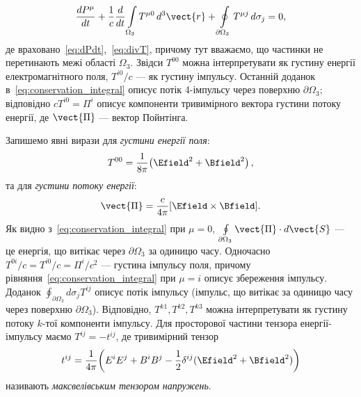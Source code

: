\begin{equation}\label{eq:conservation_integral}
    \frac{dP^{\mu}}{dt}
    + \frac{1}{c}\frac{d}{dt}\int\limits_{\Omega_3}T^{\mu 0}\,d^3\vect{r}
    + \oint\limits_{\partial\Omega_3}T^{\mu j}\,d\sigma_j = 0,
\end{equation}
де враховано~\eqref{eq:dPdt},~\eqref{eq:divT}, причому тут вважаємо, що частинки не перетинають межі області $\Omega_3$.
Звідси $T^{00}$ можна інтерпретувати як густину енергії електромагнітного поля, $T^{i0}/c$
--- як густину імпульсу. Останній доданок в~\eqref{eq:conservation_integral} описує потік 4-імпульсу через поверхню
$\partial\Omega_3$; відповідно $cT^{i0}=\Pi^i$ описує компоненти тривимірного вектора густини потоку енергії, де
$\vect{\Pi}$ --- вектор Пойнтінга.

Запишемо явні вирази для \emph{густини енергії поля}:
\begin{equation}\label{eq:T00}
    T^{00} = \frac{1}{8\pi}\!\left(\Efield^2 + \Bfield^2\right),
\end{equation}
та для \emph{густини потоку енергії}:
\begin{equation}\label{eq:Poynting}
    \vect{\Pi} = \frac{c}{4\pi}[\Efield\times\Bfield].
\end{equation}
Як видно з~\eqref{eq:conservation_integral} при $\mu=0$, $\oint\limits_{\partial\Omega_3}\vect{\Pi}\cdot d\vect{S}$ ---
це енергія, що витікає через $\partial\Omega_3$ за одиницю часу. Одночасно $T^{0i}/c = T^{i0}/c = \Pi^i/c^2$ --- густина
імпульсу поля, причому рівняння~\eqref{eq:conservation_integral} при $\mu=i$ описує збереження імпульсу. Доданок
$\oint_{\partial\Omega_3}d\sigma_j T^{ij}$ описує потік імпульсу (імпульс, що витікає за одиницю часу через поверхню
$\partial\Omega_3$). Відповідно, $T^{k1}, T^{k2}, T^{k3}$ можна інтерпретувати як густину потоку $k$-тої компоненти
імпульсу. Для просторової частини тензора енергії-імпульсу маємо $T^{ij}=-t^{ij}$, де тривимірний тензор
\begin{equation}\label{eq:Maxwell_stress}
    t^{ij} = \frac{1}{4\pi}\!\left(
    E^i E^j + B^i B^j - \frac{1}{2}\delta^{ij}(\Efield^2+\Bfield^2)
    \right)
\end{equation}
називають \emph{максвелівським тензором напружень}.

